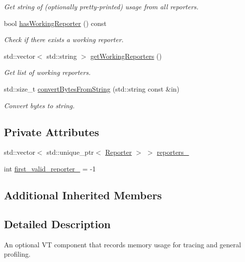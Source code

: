 \begin{DoxyCompactItemize}
\begin{DoxyCompactList}\small\item\em Get string of (optionally pretty-\/printed) usage from all reporters. \end{DoxyCompactList}\item 
bool \hyperlink{structvt_1_1util_1_1memory_1_1_memory_usage_aee12dfad3c08673967dd1fcd6a6adfb5}{has\+Working\+Reporter} () const
\begin{DoxyCompactList}\small\item\em Check if there exists a working reporter. \end{DoxyCompactList}\item 
std\+::vector$<$ std\+::string $>$ \hyperlink{structvt_1_1util_1_1memory_1_1_memory_usage_a23bded824e4360e4389d9869c3bd7f18}{get\+Working\+Reporters} ()
\begin{DoxyCompactList}\small\item\em Get list of working reporters. \end{DoxyCompactList}\item 
std\+::size\+\_\+t \hyperlink{structvt_1_1util_1_1memory_1_1_memory_usage_ad047c8acc218403b53ec97c82fa7d7e3}{convert\+Bytes\+From\+String} (std\+::string const \&in)
\begin{DoxyCompactList}\small\item\em Convert bytes to string. \end{DoxyCompactList}\end{DoxyCompactItemize}
\subsection*{Private Attributes}
\begin{DoxyCompactItemize}
\item 
std\+::vector$<$ std\+::unique\+\_\+ptr$<$ \hyperlink{structvt_1_1util_1_1memory_1_1_reporter}{Reporter} $>$ $>$ \hyperlink{structvt_1_1util_1_1memory_1_1_memory_usage_afe2db27e57d4fb6f0356c06a376cd568}{reporters\+\_\+}
\item 
int \hyperlink{structvt_1_1util_1_1memory_1_1_memory_usage_a714d3de79740091fce1761c7c0a858bd}{first\+\_\+valid\+\_\+reporter\+\_\+} = -\/1
\end{DoxyCompactItemize}
\subsection*{Additional Inherited Members}


\subsection{Detailed Description}
An optional VT component that records memory usage for tracing and general profiling. 

